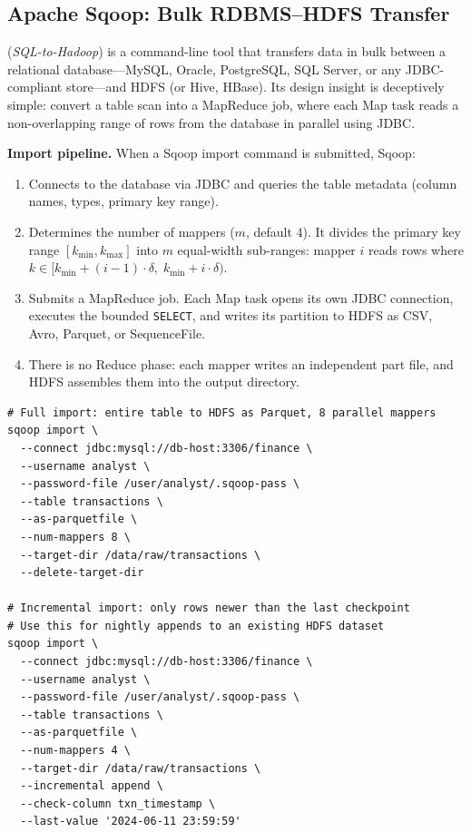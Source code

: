 \subsection{Apache Sqoop: Bulk RDBMS--HDFS Transfer}
\label{subsec:sqoop}

 (\textit{SQL-to-Hadoop}) is a command-line tool that
transfers data in bulk between a relational database---MySQL, Oracle,
PostgreSQL, SQL Server, or any JDBC-compliant store---and HDFS (or Hive,
HBase). Its design insight is deceptively simple: convert a table scan into
a MapReduce job, where each Map task reads a non-overlapping range of rows
from the database in parallel using JDBC.

\textbf{Import pipeline.} When a Sqoop import command is submitted, Sqoop:
\begin{enumerate}
  \item Connects to the database via JDBC and queries the table metadata
        (column names, types, primary key range).
  \item Determines the number of mappers ($m$, default 4). It divides the
        primary key range $[k_{\min}, k_{\max}]$ into $m$ equal-width
        sub-ranges: mapper $i$ reads rows where
        $k \in [k_{\min} + (i-1)\cdot\delta,\; k_{\min} + i\cdot\delta)$.
  \item Submits a MapReduce job. Each Map task opens its own JDBC connection,
        executes the bounded \texttt{SELECT}, and writes its partition to
        HDFS as CSV, Avro, Parquet, or SequenceFile.
  \item There is no Reduce phase: each mapper writes an independent part
        file, and HDFS assembles them into the output directory.
\end{enumerate}

\begin{lstlisting}[style=shell, caption={Sqoop: full import and incremental import}]
# Full import: entire table to HDFS as Parquet, 8 parallel mappers
sqoop import \
  --connect jdbc:mysql://db-host:3306/finance \
  --username analyst \
  --password-file /user/analyst/.sqoop-pass \
  --table transactions \
  --as-parquetfile \
  --num-mappers 8 \
  --target-dir /data/raw/transactions \
  --delete-target-dir

# Incremental import: only rows newer than the last checkpoint
# Use this for nightly appends to an existing HDFS dataset
sqoop import \
  --connect jdbc:mysql://db-host:3306/finance \
  --username analyst \
  --password-file /user/analyst/.sqoop-pass \
  --table transactions \
  --as-parquetfile \
  --num-mappers 4 \
  --target-dir /data/raw/transactions \
  --incremental append \
  --check-column txn_timestamp \
  --last-value '2024-06-11 23:59:59'
\end{lstlisting}

